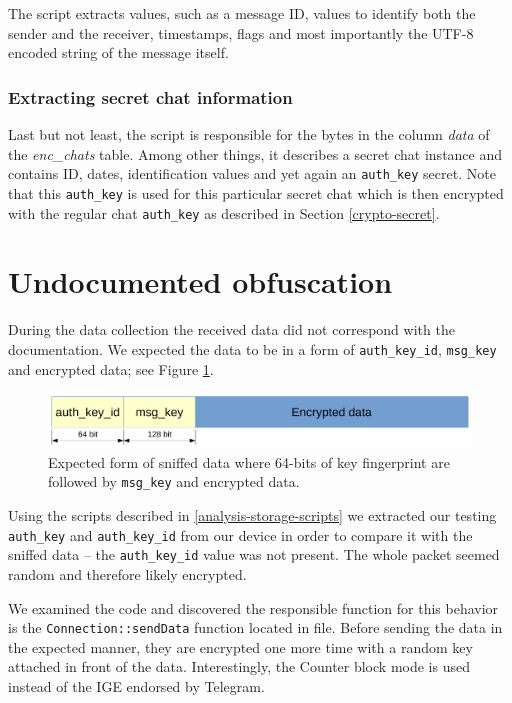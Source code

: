 \documentclass[thesis=M,english]{FITthesis}[2012/10/20]
\begin{document}
The script extracts values, such as a message ID, values to identify both the sender and the receiver, timestamps, flags and most importantly the UTF-8 encoded string of the message itself.

\subsubsection{Extracting secret chat information}

Last but not least, the  script is responsible for the bytes in the column \emph{data} of the \emph{enc\_chats} table. Among other things, it describes a secret chat instance and contains ID, dates, identification values and yet again an \texttt{auth\_key} secret. Note that this \texttt{auth\_key} is used for this particular secret chat which is then encrypted with the regular chat \texttt{auth\_key} as described in Section \ref{crypto-secret}.

\section{Undocumented obfuscation}\label{analysis-obf}

During the data collection the received data did not correspond with the documentation. We expected the data to be in a form of \texttt{auth\_key\_id}, \texttt{msg\_key} and encrypted data; see Figure \ref{img:analysis-obf-expected}.

\begin{figure}[htb]
	\centering
	\includegraphics[width=1\textwidth]{sniffed-expected.pdf}
	\caption[Expected form of sniffed data]{Expected form of sniffed data where 64-bits of key fingerprint are followed by \texttt{msg\_key} and encrypted data.}
	\label{img:analysis-obf-expected}
\end{figure}

Using the scripts described in \ref{analysis-storage-scripts} we extracted our testing \texttt{auth\_key} and \texttt{auth\_key\_id} from our device in order to compare it with the sniffed data -- the \texttt{auth\_key\_id} value was not present. The whole packet seemed random and therefore likely encrypted.

We examined the code and discovered the responsible function for this behavior is the \texttt{Connection::sendData} function located in  file. Before sending the data in the expected manner, they are encrypted one more time with a random key attached in front of the data. Interestingly, the Counter block mode is used instead of the IGE endorsed by Telegram.
\end{document}
